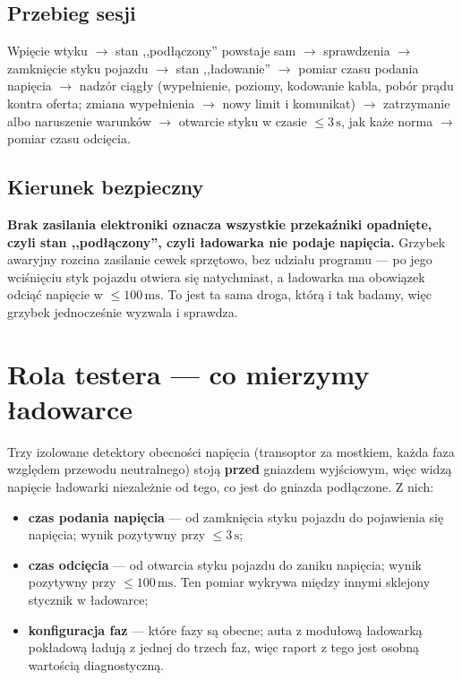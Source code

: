 \documentclass[a4paper,11pt]{article}
\newcommand{\ms}{\,\mathrm{ms}}
\newcommand{\sek}{\,\mathrm{s}}
\begin{document}
\subsection{Przebieg sesji}

Wpięcie wtyku $\rightarrow$ stan ,,podłączony'' powstaje sam $\rightarrow$
sprawdzenia $\rightarrow$ zamknięcie styku pojazdu $\rightarrow$ stan ,,ładowanie''
$\rightarrow$ pomiar czasu podania napięcia $\rightarrow$ nadzór ciągły
(wypełnienie, poziomy, kodowanie kabla, pobór prądu kontra oferta; zmiana
wypełnienia $\rightarrow$ nowy limit i komunikat) $\rightarrow$ zatrzymanie albo
naruszenie warunków $\rightarrow$ otwarcie styku w czasie $\le 3\sek$, jak każe
norma $\rightarrow$ pomiar czasu odcięcia.

\subsection{Kierunek bezpieczny}

\textbf{Brak zasilania elektroniki oznacza wszystkie przekaźniki opadnięte, czyli
stan ,,podłączony'', czyli ładowarka nie podaje napięcia.} Grzybek awaryjny
rozcina zasilanie cewek sprzętowo, bez udziału programu --- po jego wciśnięciu
styk pojazdu otwiera się natychmiast, a ładowarka ma obowiązek odciąć napięcie
w $\le100\ms$. To jest ta sama droga, którą i tak badamy, więc grzybek jednocześnie
wyzwala i sprawdza.

\section{Rola testera --- co mierzymy ładowarce}
\label{sec:tester}

Trzy izolowane detektory obecności napięcia (transoptor za mostkiem, każda faza
względem przewodu neutralnego) stoją \textbf{przed} gniazdem wyjściowym, więc widzą
napięcie ładowarki niezależnie od tego, co jest do gniazda podłączone. Z nich:

\begin{itemize}
\item \textbf{czas podania napięcia} --- od zamknięcia styku pojazdu do pojawienia
      się napięcia; wynik pozytywny przy $\le3\sek$;
\item \textbf{czas odcięcia} --- od otwarcia styku pojazdu do zaniku napięcia;
      wynik pozytywny przy $\le100\ms$. Ten pomiar wykrywa między innymi sklejony
      stycznik w ładowarce;
\item \textbf{konfiguracja faz} --- które fazy są obecne; auta z modułową ładowarką
      pokładową ładują z jednej do trzech faz, więc raport z tego jest osobną
      wartością diagnostyczną.
\end{itemize}
\end{document}
